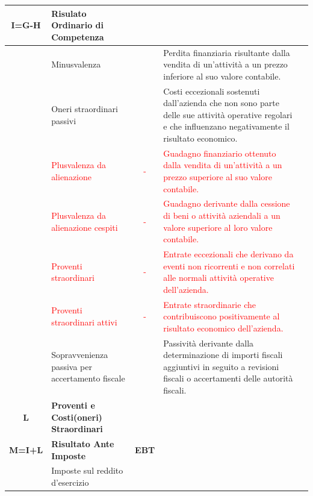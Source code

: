 \documentclass{article}
\newcommand{\Minusvalenza}{Perdita finanziaria risultante dalla vendita di un'attività a un prezzo inferiore al suo valore contabile.}
\newcommand{\OneriStraordinariPassivi}{Costi eccezionali sostenuti dall'azienda che non sono parte delle sue attività operative regolari e che influenzano negativamente il risultato economico.}
\newcommand{\PlusvalenzaAlienazione}{Guadagno finanziario ottenuto dalla vendita di un'attività a un prezzo superiore al suo valore contabile.}
\newcommand{\PlusvalenzaCespiti}{Guadagno derivante dalla cessione di beni o attività aziendali a un valore superiore al loro valore contabile.}
\newcommand{\ProventiStraordinari}{Entrate eccezionali che derivano da eventi non ricorrenti e non correlati alle normali attività operative dell'azienda.}
\newcommand{\ProventiStraordinariAttivi}{Entrate straordinarie che contribuiscono positivamente al risultato economico dell'azienda.}
\newcommand{\SopravvenienzaPassivaAccertamentoFiscale}{Passività derivante dalla determinazione di importi fiscali aggiuntivi in seguito a revisioni fiscali o accertamenti delle autorità fiscali.}
\begin{document}
\begin{table}[ht]
{\begin{tabular}{|c l|c|l|c|}
            \hline
            \textbf{I=G-H} & \textbf{Risulato Ordinario di Competenza}                               &                    &                                                             &           \\
            \hline
                           & Minusvalenza                                                            &                    & \Minusvalenza                                               &           \\
                           & Oneri straordinari passivi                                              &                    & \OneriStraordinariPassivi                                   &           \\
                           & \textcolor{red}{Plusvalenza da alienazione}                             & \textcolor{red}{-} & \textcolor{red}{\PlusvalenzaAlienazione}                    &           \\
                           & \textcolor{red}{Plusvalenza da alienazione cespiti}                     & \textcolor{red}{-} & \textcolor{red}{\PlusvalenzaCespiti}                        &           \\
                           & \textcolor{red}{Proventi straordinari}                                  & \textcolor{red}{-} & \textcolor{red}{\ProventiStraordinari}                      &           \\
                           & \textcolor{red}{Proventi straordinari attivi}                           & \textcolor{red}{-} & \textcolor{red}{\ProventiStraordinariAttivi}                &           \\
                           & Sopravvenienza passiva per accertamento fiscale                         &                    & \SopravvenienzaPassivaAccertamentoFiscale                   &           \\
            \textbf{L}     & \textbf{Proventi e Costi(oneri) Straordinari}                           &                    &                                                             &           \\
            \hline
            \textbf{M=I+L} & \textbf{Risultato Ante Imposte}                                         & \textbf{EBT}       &                                                             &           \\
            \hline
                           & Imposte sul reddito d'esercizio                                         &                    &                                                             &           \\

\end{tabular}}
\end{table}
\end{document}
